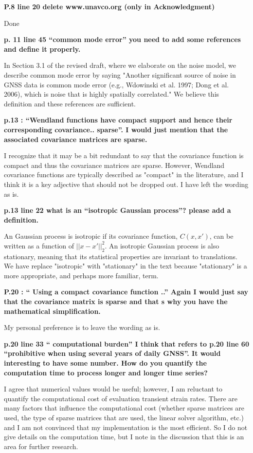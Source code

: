 \documentclass[10pt,a4paper]{letter}
\begin{document}
\begin{letter}{}
\textbf{P.8 line 20 delete www.unavco.org (only in Acknowledgment)}

Done

\textbf{p. 11 line 45 “common mode error” you need to add some references and
define it properly.}

In Section 3.1 of the revised draft, where we elaborate on the noise
model, we describe common mode error by saying "Another significant
source of noise in GNSS data is common mode error (e.g., Wdowinski et
al. 1997; Dong et al. 2006), which is noise that is highly spatially
correlated." We believe this definition and these references are
sufficient.

\textbf{p.13 : “Wendland functions have compact support and hence their
corresponding covariance.. sparse”. I would just mention that the
associated covariance matrices are sparse.}

I recognize that it may be a bit redundant to say that the covariance
function is compact and thus the covariance matrices are sparse.
However, Wendland covariance functions are typically described as
"compact" in the literature, and I think it is a key adjective that
should not be dropped out. I have left the wording as is.

\textbf{p.13 line 22 what is an “isotropic Gaussian process”? please add a
definition.}

An Gaussian process is isotropic if its covariance function,
$C(x,x')$, can be written as a function of $||x - x'||_2^2$. An
isotropic Gaussian process is also stationary, meaning that its
statistical properties are invariant to translations. We have replace
"isotropic" with "stationary" in the text because "stationary" is a
more appropriate, and perhaps more familiar, term.

\textbf{P.20 : “ Using a compact covariance function ..” Again I would just
say that the covariance matrix is sparse and that s why you have the
mathematical simplification.}

My personal preference is to leave the wording as is.

\textbf{p.20 line 33 “ computational burden” I think that refers to p.20 line
60 “prohibitive when using several years of daily GNSS”. It would
interesting to have some number. How do you quantify the computation
time to process longer and longer time series?}

I agree that numerical values would be useful; however, I am reluctant
to quantify the computational cost of evaluation transient strain
rates. There are many factors that influence the computational cost
(whether sparse matrices are used, the type of sparse matrices that
are used, the linear solver algorithm, etc.) and I am not convinced
that my implementation is the most efficient. So I do not give details
on the computation time, but I note in the discussion that this is an
area for further research.


\end{letter}
\end{document}
